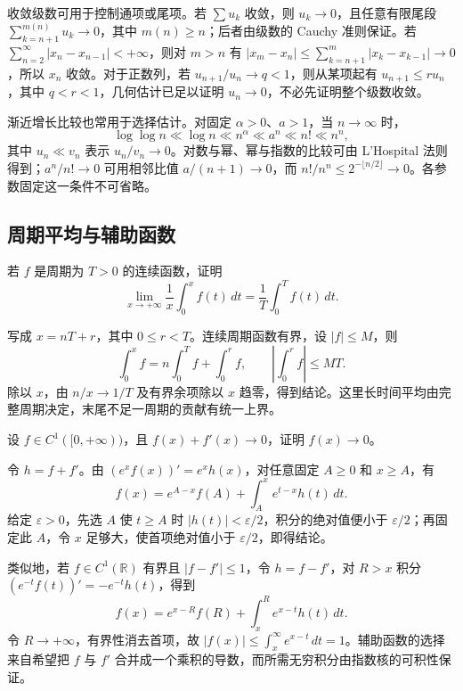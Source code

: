 收敛级数可用于控制通项或尾项。若 $\sum u_k$ 收敛，则 $u_k\to0$，且任意有限尾段 $\sum_{k=n+1}^{m(n)}u_k\to0$，其中 $m(n)\ge n$；后者由级数的 Cauchy 准则保证。若 $\sum_{n=2}^\infty|x_n-x_{n-1}|<+\infty$，则对 $m>n$ 有 $|x_m-x_n|\le\sum_{k=n+1}^m|x_k-x_{k-1}|\to0$，所以 $x_n$ 收敛。对于正数列，若 $u_{n+1}/u_n\to q<1$，则从某项起有 $u_{n+1}\le r u_n$，其中 $q<r<1$，几何估计已足以证明 $u_n\to0$，不必先证明整个级数收敛。

渐近增长比较也常用于选择估计。对固定 $\alpha>0$、$a>1$，当 $n\to\infty$ 时，
\[
    \log\log n\ll\log n\ll n^\alpha\ll a^n\ll n!\ll n^n,
\]
其中 $u_n\ll v_n$ 表示 $u_n/v_n\to0$。对数与幂、幂与指数的比较可由 L'Hospital 法则得到；$a^n/n!\to0$ 可用相邻比值 $a/(n+1)\to0$，而 $n!/n^n\le2^{-\lfloor n/2\rfloor}\to0$。各参数固定这一条件不可省略。

\subsection{周期平均与辅助函数}

\begin{example}
\label{ex:pei-periodic-average}
若 $f$ 是周期为 $T>0$ 的连续函数，证明
\[
    \lim_{x\to+\infty}\frac1x\int_0^xf(t)\,dt
    =\frac1T\int_0^Tf(t)\,dt.
\]
\end{example}
\begin{solve}
写成 $x=nT+r$，其中 $0\le r<T$。连续周期函数有界，设 $|f|\le M$，则
\[
    \int_0^xf=n\int_0^Tf+\int_0^rf,
    \qquad\left|\int_0^rf\right|\le MT.
\]
除以 $x$，由 $n/x\to1/T$ 及有界余项除以 $x$ 趋零，得到结论。这里长时间平均由完整周期决定，末尾不足一周期的贡献有统一上界。
\end{solve}

\begin{example}
\label{ex:pei-integrating-factor}
设 $f\in C^1([0,+\infty))$，且 $f(x)+f'(x)\to0$，证明 $f(x)\to0$。
\end{example}
\begin{solve}
令 $h=f+f'$。由 $(e^xf(x))'=e^xh(x)$，对任意固定 $A\ge0$ 和 $x\ge A$，有
\[
    f(x)=e^{A-x}f(A)+\int_A^xe^{t-x}h(t)\,dt.
\]
给定 $\varepsilon>0$，先选 $A$ 使 $t\ge A$ 时 $|h(t)|<\varepsilon/2$，积分的绝对值便小于 $\varepsilon/2$；再固定此 $A$，令 $x$ 足够大，使首项绝对值小于 $\varepsilon/2$，即得结论。
\end{solve}

类似地，若 $f\in C^1(\mathbb{R})$ 有界且 $|f-f'|\le1$，令 $h=f-f'$，对 $R>x$ 积分 $ (e^{-t}f(t))'=-e^{-t}h(t)$，得到
\[
    f(x)=e^{x-R}f(R)+\int_x^Re^{x-t}h(t)\,dt.
\]
令 $R\to+\infty$，有界性消去首项，故 $|f(x)|\le\int_x^\infty e^{x-t}\,dt=1$。辅助函数的选择来自希望把 $f$ 与 $f'$ 合并成一个乘积的导数，而所需无穷积分由指数核的可积性保证。

